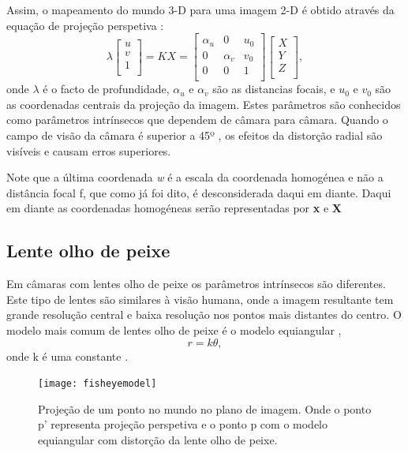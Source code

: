 Assim, o mapeamento do mundo 3-D para uma imagem 2-D é obtido através da equação de projeção perspetiva :
\[  \textbf{$\lambda$} \left[ \begin{array}{c} u\\v\\1\\ \end{array} \right] = 
KX = \left[ \begin{array}{ccc} \alpha_u  & 0 & \textit{u}_0 \\ 
0 & \alpha_v & \textit{v}_0 \\ 
0 & 0 & 1 \\
\end{array} \right] \left[ \begin{array}{c} X \\ 
Y \\ 
Z \\ 
\end{array} \right] , \]
onde $\lambda$ é o facto de profundidade, $\alpha_u$ e $\alpha_v$ são as distancias focais, e $\textit{u}_0$ e $\textit{v}_0$ são as coordenadas centrais da projeção da imagem. Estes parâmetros são conhecidos como parâmetros intrínsecos que dependem de câmara para câmara. Quando o campo de visão da câmara é superior a 45º , os efeitos da distorção radial são visíveis e causam erros superiores.

Note que a última coordenada \textit{w} é a escala da coordenada homogénea e não a distância focal f, que como já foi dito, é desconsiderada daqui em diante. Daqui em diante as coordenadas homogéneas serão representadas por \textbf{x} e \textbf{X} 


\subsection{Lente olho de peixe}

Em câmaras com lentes olho de peixe os parâmetros intrínsecos são diferentes. Este tipo de lentes são similares à visão humana, onde a imagem resultante tem grande resolução central e baixa resolução nos pontos mais distantes do centro. O modelo mais comum de lentes olho de peixe é o modelo equiangular ,  \[ r = k \theta ,  \] onde k é uma constante \cite{Hansen2009}.

\begin{figure}[h!] %
	\begin{center}
		\leavevmode		
		\texttt{[image: fisheyemodel]}
		\caption{Projeção de um ponto no mundo no plano de imagem. Onde o ponto p' representa projeção perspetiva e o ponto p com o modelo equiangular com distorção da lente olho de peixe. \cite{Srestasathiern2014,Kannala2004}}
		\label{fig:fishvspinhole} 
	\end{center}
\end{figure}

